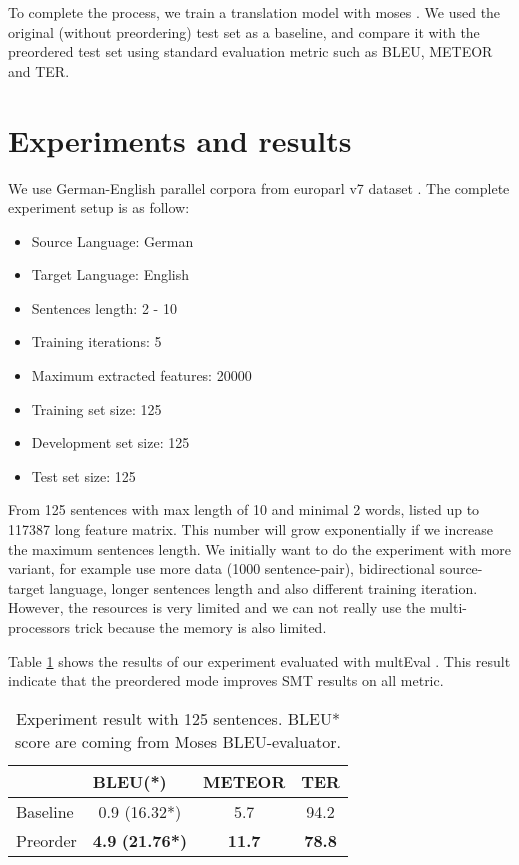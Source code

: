 \documentclass[11pt,DIV=11]{scrartcl}
\begin{document}
To complete the process, we train a translation model with moses \cite{Koehn2006}.
We used the original (without preordering) test set as a baseline, and compare it with the preordered test set using standard evaluation metric such as BLEU, METEOR and TER.

\section{Experiments and results}
\label{experiments-results}

We use German-English parallel corpora from europarl v7 dataset \cite{Koehn2005}.
The complete experiment setup is as follow:
\begin{itemize}
	\item Source Language: German
	\item Target Language: English
	\item Sentences length: 2 - 10
	\item Training iterations: 5
	\item Maximum extracted features: 20000
	\item Training set size: 125
	\item Development set size: 125
	\item Test set size: 125
\end{itemize}

From 125 sentences with max length of 10 and minimal 2 words, listed up to 117387 long feature matrix.
This number will grow exponentially if we increase the maximum sentences length.
We initially want to do the experiment with more variant, for example use more data (1000 sentence-pair), bidirectional source-target language, longer sentences length and also different training iteration.
However, the resources is very limited and we can not really use the multi-processors trick because the memory is also limited.

Table \ref{evaluation} shows the results of our experiment evaluated with multEval \cite{Clark2011}.
This result indicate that the preordered mode improves SMT results on all metric.

\begin{table}[h]
	\centering
	\begin{tabular}{@{}lccc@{}}
		\toprule
		& \multicolumn{1}{l}{BLEU(*)} & \multicolumn{1}{l}{METEOR} & \multicolumn{1}{l}{TER} \\ \midrule
		Baseline & 0.9 (16.32*) & 5.7 & 94.2 \\
		Preorder & \textbf{4.9} \textbf{(21.76*)} & \textbf{11.7} & \textbf{78.8} \\ \bottomrule
	\end{tabular}
	\caption{Experiment result with 125 sentences. BLEU* score are coming from Moses BLEU-evaluator.}
	\label{evaluation}
\end{table}
\end{document}
